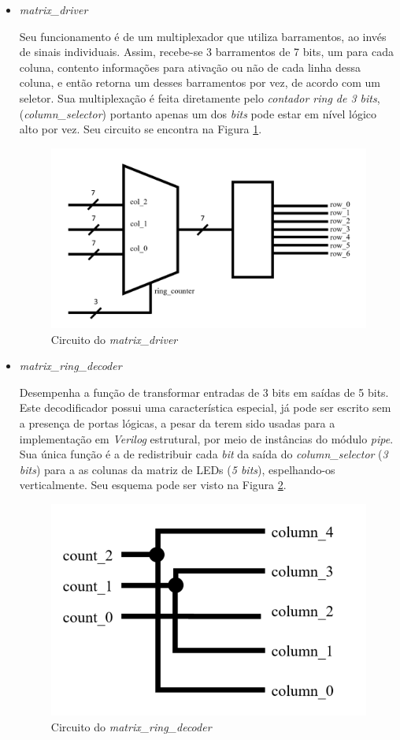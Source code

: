\documentclass[
	article,			%
	11pt,				%
	oneside,			%
	a4paper,			%
	english,			%
	brazil,				%
	sumario=tradicional
	]{abntex2}
\begin{document}
\begin{itemize}
\item \textit{matrix\_driver}

Seu funcionamento é de um multiplexador que utiliza barramentos, ao invés de sinais individuais. Assim, recebe-se 3 barramentos de 7 bits, um para cada coluna, contento informações para ativação ou não de cada linha dessa coluna, e então retorna um desses barramentos por vez, de acordo com um seletor. Sua multiplexação é feita diretamente pelo \textit{contador ring de 3 bits}, (\textit{column\_selector}) portanto apenas um dos \textit{bits} pode estar em nível lógico alto por vez. Seu circuito se encontra na Figura \ref{fig:matrix_driver}.

\begin{figure}[H]
    \centering
    \includegraphics[width=0.5\linewidth]{matrix_driver.png}
    \caption{Circuito do \textit{matrix\_driver}}
    \label{fig:matrix_driver}
\end{figure}


    \item \textit{matrix\_ring\_decoder} 

    Desempenha a função de transformar entradas de 3 bits em saídas de 5 bits. Este decodificador possui uma característica especial, já pode ser escrito sem a presença de portas lógicas, a pesar da terem sido usadas para a implementação em \textit{Verilog} estrutural, por meio de instâncias do módulo \textit{pipe}. Sua única função é a de redistribuir cada \textit{bit} da saída do \textit{column\_selector} (\textit{3 bits}) para a as colunas da matriz de LEDs (\textit{5 bits}), espelhando-os verticalmente. Seu esquema pode ser visto na Figura \ref{fig:ring_counter}.

\begin{figure}[H]
    \centering
    \includegraphics[width=0.5\linewidth]{image.png}
    \caption{Circuito do \textit{matrix\_ring\_decoder} }
    \label{fig:ring_counter}
\end{figure}


\end{itemize}
\end{document}
